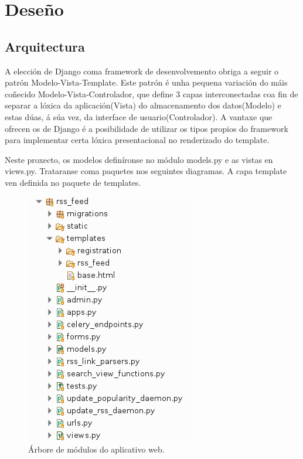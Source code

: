 \chapter[Deseño]{
  \label{chp:disenho}
  Deseño
}
\minitoc
\newpage



\section{Arquitectura}

A elección de Django coma framework de desenvolvemento obriga a seguir o patrón Modelo-Vista-Template. Este patrón é unha pequena variación do máis coñecido Modelo-Vista-Controlador, que define 3 capas interconectadas coa fin de separar a lóxica da aplicación(Vista) do almacenamento dos datos(Modelo) e estas dúas, á súa vez, da interface de usuario(Controlador). A vantaxe que ofrecen os  de Django é a posibilidade de utilizar os tipos propios do framework para implementar certa lóxica presentacional no renderizado do template.

Neste proxecto, os modelos  definíronse no módulo models.py e as vistas en views.py. Trataranse coma paquetes nos seguintes diagramas. A capa template ven definida no paquete de templates.

\begin{figure}[h]
	\centering
	\includegraphics[scale=0.6,keepaspectratio=true]{./images/project_tree.png}
	\caption{Árbore de módulos do aplicativo web.}
	\label{fig:project_tree}
\end{figure}


